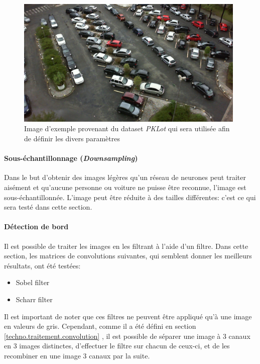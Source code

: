 \begin{figure}[ht]
    \includegraphics[width=110mm]{img/conception/pklot_park.jpg}
    \centering
    \caption{Image d'exemple provenant du dataset \textit{PKLot} qui sera utilisée afin de définir les divers paramètres}
    \label{fig:pklot-park}
\end{figure}


\paragraph{Sous-échantillonnage (\textit{Downsampling})}
Dans le but d'obtenir des images légères qu'un réseau de neurones peut traiter aisément et qu'aucune personne ou voiture ne puisse être reconnue, l'image est sous-échantillonnée. L'image peut être réduite à des tailles différentes: c'est ce qui sera testé dans cette section.

\paragraph{Détection de bord}
Il est possible de traiter les images en les filtrant à l'aide d'un filtre. Dans cette section, les matrices de convolutions suivantes, qui semblent donner les meilleurs résultats, ont été testées:
\begin{itemize}
    \item Sobel filter
    \item Scharr filter
\end{itemize} 

Il est important de noter que ces filtres ne peuvent être appliqué qu'à une image en valeurs de gris. Cependant, comme il a été défini en section \ref{techno.traitement.convolution} , il est possible de séparer une image à 3 canaux en 3 images distinctes, d'effectuer le filtre sur chacun de ceux-ci, et de les recombiner en une image 3 canaux par la suite. 

